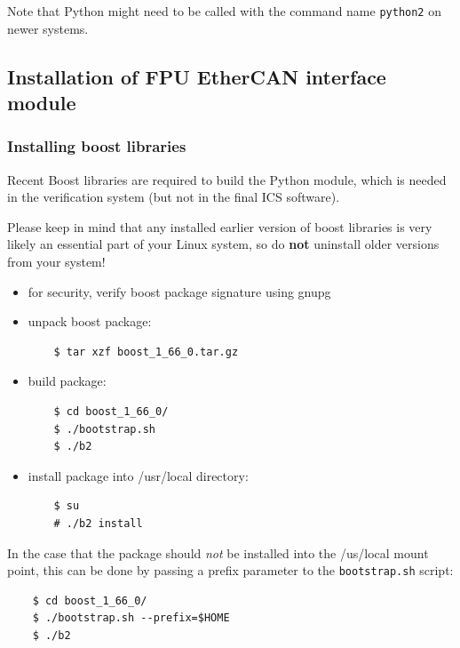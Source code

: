 \documentclass[11pt,a4paper]{report}
\begin{document}
Note that Python might need to be called with the command name
\texttt{python2} on newer systems.


\subsection{Installation of FPU EtherCAN interface module}
\subsubsection{Installing boost libraries}
Recent Boost libraries are required to build the Python module, which
is needed in the verification system (but not in the final ICS
software).

Please keep in mind that any installed earlier version of boost
libraries is very likely an essential part of your Linux system, so do
\textbf{not} uninstall older versions from your system!

\begin{itemize}
\item for security, verify boost package signature using gnupg

\item unpack boost package:
  
  \begin{verbatim}
    $ tar xzf boost_1_66_0.tar.gz
  \end{verbatim}    

\item build package:

  \begin{verbatim}
    $ cd boost_1_66_0/
    $ ./bootstrap.sh
    $ ./b2
  \end{verbatim}


\item install package into /usr/local directory:

  \begin{verbatim}
    $ su
    # ./b2 install
  \end{verbatim}    
\end{itemize}

In the case that the package  should \emph{not} be installed
into the /us/local mount point, this can be done by passing
a prefix parameter to the \texttt{bootstrap.sh} script:

  \begin{verbatim}
    $ cd boost_1_66_0/
    $ ./bootstrap.sh --prefix=$HOME
    $ ./b2
  \end{verbatim}
\end{document}
